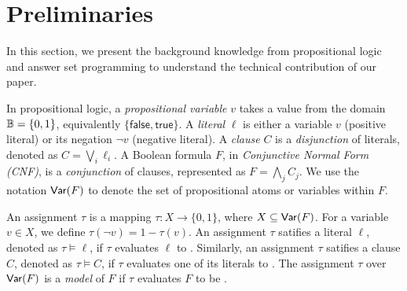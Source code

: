 \section{Preliminaries}
\label{section:preliminaries}
In this section, we present the background knowledge from propositional logic and answer set programming to understand the technical contribution of our paper. 

In propositional logic, a \emph{propositional variable} $v$ takes a value from the domain $\mathbb{B} = \{0,1\}$, equivalently $\{\mathsf{false}, \mathsf{true}\}$. 
A \emph{literal} $\ell$ is either a variable $v$ (positive literal) or its negation $\neg{v}$ (negative literal).
A \emph{clause} $C$ is a {\em disjunction} of literals, denoted as $C = \bigvee_{i} \ell_i$. 
A Boolean formula $F$, in \emph{Conjunctive Normal Form (CNF)}, is a {\em conjunction}
of clauses, represented as $F = \bigwedge_{j} C_j$. We use the notation $\mathsf{Var}(F)$ to denote the set of propositional atoms or variables within  
$F$. 

An assignment $\tau$ is a mapping $\tau: X \rightarrow \{0,1\}$, where $X \subseteq \mathsf{Var}(F)$.  For a variable $v \in X$, we define
$\tau(\neg{v}) = 1 - \tau(v)$. 
An assignment $\tau$ satifies a literal $\ell$, denoted as $\tau \models \ell$, if $\tau$ evaluates $\ell$ to \true.
Similarly, an assignment $\tau$ satifies a clause $C$, denoted as $\tau \models C$, if $\tau$ evaluates one of its literals to \true.
The assignment $\tau$ over $\mathsf{Var}(F)$ is a {\em model} of $F$ if $\tau$ evaluates $F$ to be \true. 